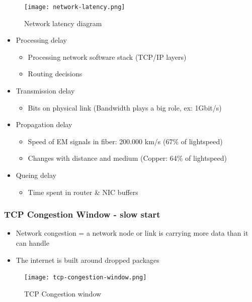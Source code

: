 \documentclass{article}
\begin{document}
\begin{figure}[H]
    \centering
    \texttt{[image: network-latency.png]}
    \caption{Network latency diagram}
\end{figure}

\begin{itemize}
    \item Processing delay
    \begin{itemize}
        \item Processing network software stack (TCP/IP layers)
        \item Routing decisions
    \end{itemize}
    \item Transmission delay
    \begin{itemize}
        \item Bits on physical link (Bandwidth plays a big role, ex: 1Gbit/s)
    \end{itemize}
    \item Propagation delay
    \begin{itemize}
        \item Speed of EM signals in fiber: 200.000 km/s (67\% of lightspeed)
        \item Changes with distance and medium (Copper: 64\% of lightspeed)
    \end{itemize}
    \item Queing delay
    \begin{itemize}
        \item Time spent in router \& NIC buffers
    \end{itemize}
\end{itemize}

\subsubsection{TCP Congestion Window - slow start}

\begin{itemize}
    \item Network congestion = a network node or link is carrying more data than it can handle
    \item The internet is built around dropped packages
\end{itemize}

\begin{figure}[H]
    \centering
    \texttt{[image: tcp-congestion-window.png]}
    \caption{TCP Congestion window}
\end{figure}
\end{document}
